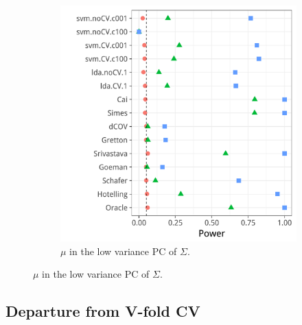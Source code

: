 \documentclass[journal]{IEEEtran}
\begin{document}
\begin{figure}[h]
\begin{subfigure}[t]{0.45\columnwidth}
		\includegraphics[width=1\columnwidth]{"art/file24"}
		\caption{$\mu$ in the low variance PC of $\Sigma$.}  
		\label{fig:heteroskedastic_12}	
	\end{subfigure}
\end{figure}







\subsection{Departure from V-fold CV}
\label{sec:bootstrap}
\end{document}
